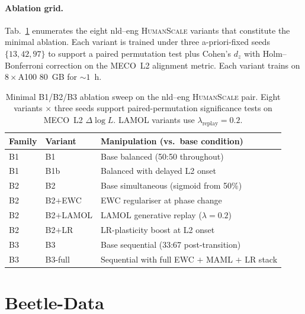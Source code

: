 \paragraph{Ablation grid.} Tab.~\ref{tab:ablation-sweep} enumerates the eight nld--eng \textsc{HumanScale} variants that constitute the minimal ablation. Each variant is trained under three a-priori-fixed seeds $\{13, 42, 97\}$ to support a paired permutation test plus Cohen's $d_z$ with Holm--Bonferroni correction on the MECO~L2 alignment metric. Each variant trains on $8\times$A100 80~GB for ${\sim}1$~h.
 
\begin{table}[t]
\centering
\small
\caption{Minimal B1/B2/B3 ablation sweep on the nld--eng \textsc{HumanScale} pair. Eight variants $\times$ three seeds support paired-permutation significance tests on MECO~L2 $\Delta\log L$. LAMOL variants use $\lambda_{\text{replay}}=0.2$.}
\label{tab:ablation-sweep}
\begin{tabular}{@{}l l l@{}}
\toprule
Family & Variant & Manipulation (vs.\ base condition) \\
\midrule
B1 & B1        & Base balanced (50:50 throughout) \\
B1 & B1b       & Balanced with delayed L2 onset \\
\midrule
B2 & B2        & Base simultaneous (sigmoid from 50\%) \\
B2 & B2$+$EWC   & EWC regulariser at phase change \\
B2 & B2$+$LAMOL & LAMOL generative replay ($\lambda=0.2$) \\
B2 & B2$+$LR    & LR-plasticity boost at L2 onset \\
\midrule
B3 & B3        & Base sequential (33:67 post-transition) \\
B3 & B3-full   & Sequential with full EWC $+$ MAML $+$ LR stack \\
\bottomrule
\end{tabular}
\end{table}
 
 
\section{Beetle-Data}\label{sec:beetle-data}
 
